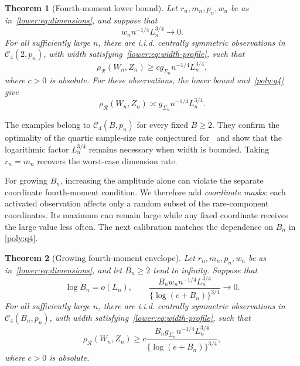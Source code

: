 \documentclass[11pt,letterpaper]{article}
\newtheorem{theorem}{Theorem}
\theoremstyle{remark}
\newcommand{\rh}{\rho_{\mathcal R}}
\begin{document}
\begin{theorem}[Fourth-moment lower bound]\label{opt:q4-lower}
Let \(r_n,m_n,p_n,w_n\) be as in~\eqref{lower:eq:dimensions},
and suppose that
\[
 w_n n^{-1/4}L_n^{3/4}\longrightarrow0.
\]
For all sufficiently large \(n\), there are i.i.d. centrally
symmetric observations in \(\mathcal C_4(2,p_n)\), with width
satisfying~\eqref{lower:eq:width-profile}, such that
\begin{equation}
 \rh(W_n,Z_n)\ge c g_{\Sigma_n}n^{-1/4}L_n^{3/4},
 \label{opt:eq:q4-lower}
\end{equation}
where \(c>0\) is absolute. For these observations, the lower bound
and~\eqref{poly:q4} give
\begin{equation}
 \rh(W_n,Z_n)\asymp g_{\Sigma_n}n^{-1/4}L_n^{3/4}.
 \label{lower:q4-fixed}
\end{equation}
\end{theorem}

The examples belong to $\mathcal C_4(B,p_n)$ for every fixed
$B\ge2$. They confirm the optimality of the quartic sample-size
rate conjectured for~\cite[Theorem~2.5]{CCKK2022} and show that
the logarithmic factor $L_n^{3/4}$ remains necessary when width
is bounded. Taking $r_n=m_n$ recovers the worst-case dimension
rate.

For growing $B_n$, increasing the amplitude alone can violate the
separate coordinate fourth-moment condition. We therefore add
\emph{coordinate masks}: each activated observation affects only a random
subset of the rare-component coordinates. Its maximum can remain
large while any fixed coordinate receives the large value less
often. The next calibration matches the dependence on $B_n$ in
\eqref{poly:q4}.

\begin{theorem}[Growing fourth-moment envelope]\label{opt:q4-growing}
Let \(r_n,m_n,p_n,w_n\) be as in~\eqref{lower:eq:dimensions},
and let \(B_n\ge2\) tend to infinity. Suppose that
\[
 \log B_n=o(L_n),\qquad
 \frac{B_n w_n n^{-1/4}L_n^{3/4}}
 {\{\log(e+B_n)\}^{3/4}}\longrightarrow0.
\]
For all sufficiently large \(n\), there are i.i.d. centrally
symmetric observations in \(\mathcal C_4(B_n,p_n)\), with width
satisfying~\eqref{lower:eq:width-profile}, such that
\begin{equation}
 \rh(W_n,Z_n)\ge
 c\frac{B_n g_{\Sigma_n}n^{-1/4}L_n^{3/4}}
 {\{\log(e+B_n)\}^{3/4}},
 \label{opt:eq:q4-growing}
\end{equation}
where \(c>0\) is absolute.
\end{theorem}
\end{document}
